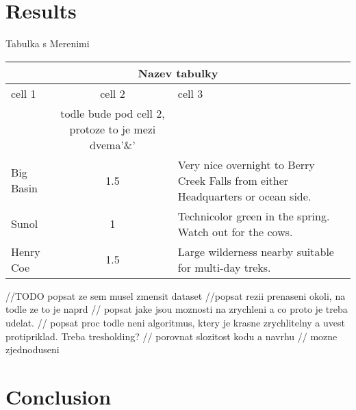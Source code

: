 \chapter{Results}

Tabulka s Merenimi
\begin{center}
\begin{tabular}{|l|c|p{3.5in}|}
\hline
\multicolumn{3}{|c|}{Nazev tabulky}\\
\hline cell 1&cell 2&cell 3\\&todle bude pod cell 2, protoze to je mezi dvema'\&' &\\
\hline Big Basin&1.5&Very nice overnight to Berry Creek Falls from
either Headquarters or ocean side.\\
\hline Sunol&1&Technicolor green in the spring. Watch out for the cows.\\
\hline Henry Coe&1.5&Large wilderness nearby suitable for multi-day treks.\\
\hline
\end{tabular}
\end{center}

//TODO popsat ze sem musel zmensit dataset
//popsat rezii prenaseni okoli, na todle ze to je naprd
// popsat jake jsou moznosti na zrychleni a co proto je treba udelat.
// popsat proc todle neni algoritmus, ktery je krasne zrychlitelny a uvest protipriklad. Treba tresholding?
// porovnat slozitost kodu a navrhu
// mozne zjednoduseni

\chapter{Conclusion}

